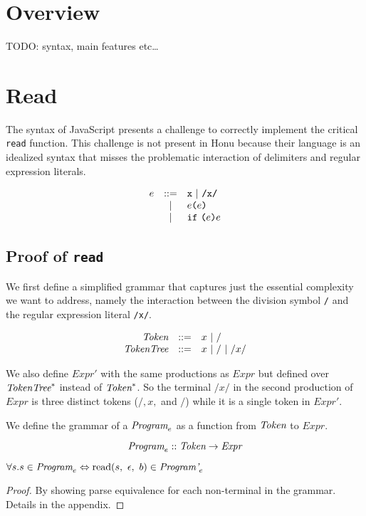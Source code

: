 \documentclass[onecolumn]{sigplanconf-onecolumn}
\begin{document}
\section{Overview}
\label{sec-2}
TODO: syntax, main features etc\ldots


\section{Read}
\label{sec-3}

The syntax of JavaScript presents a challenge to correctly implement
the critical \texttt{read} function. This challenge is not present in
Honu because their language is an idealized syntax that misses the
problematic interaction of delimiters and regular expression literals.

\[
\begin{array}{rcl}
  e &::=& \texttt{x} ~|~ \texttt{/x/} \\
  &|& e \texttt{(}e\texttt{)} \\
  &|& \texttt{if}~\texttt{(}e\texttt{)}e
\end{array}
\]

\subsection{Proof of \texttt{read}}
\label{sec-3-1}

We first define a simplified grammar that captures just the essential
complexity we want to address, namely the interaction between
the division symbol \texttt{/} and the regular expression literal
\texttt{/x/}.

\[
\begin{array}{rrl}
  \textit{Token} &::=& x ~|~ /
  \\
  \textit{TokenTree} &::=& x ~|~ / ~|~ /x/
  \\
\end{array}
\]

We also define \( \textit{Expr}' \) with the same productions as \(
\textit{Expr} \) but defined over \( \textit{TokenTree}^{*} \) instead of \( \textit{Token}^{*}
\). So the terminal \( /x/ \) in the second production of \(
\textit{Expr} \) is three distinct tokens (\( /, x, \) and \( /
\)) while it is a single token in \( \textit{Expr}' \).

We define the grammar of a \( \textit{Program}_{e} \) as a function from
\( \textit{Token} \) to \( \textit{Expr} \).

\[
\textit{Program}_{e} :: \textit{Token} \rightarrow \textit{Expr}
\]

\begin{theorem}\mbox{}

  \( \forall s. s \in \textit{Program}_{e} \Leftrightarrow 
  \textrm{read}(s,~\epsilon,~b) \in \textit{Program'}_{e} \)

\end{theorem}
\begin{proof}\mbox{}
  
By showing parse equivalence for each non-terminal in the grammar.
Details in the appendix.
\end{proof}
\end{document}
